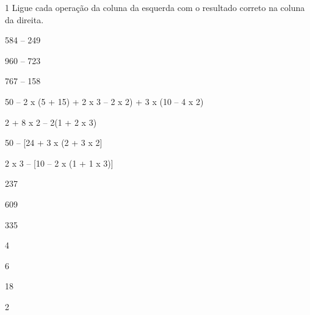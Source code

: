 

\num{1} Ligue cada operação da coluna da esquerda com o resultado correto na
coluna da direita.

\begin{multicols}{2}
584 -- 249

960 -- 723

767 -- 158

50 -- 2 x (5 + 15) + 2 x 3 -- 2 x 2) + 3 x (10 -- 4 x 2)

2 + 8 x 2 -- 2(1 + 2 x 3)

50 -- {[}24 + 3 x (2 + 3 x 2{]}

2 x 3 -- {[}10 -- 2 x (1 + 1 x 3){]}

\columnbreak

237

609

335

4

6

18

2
\end{multicols}

